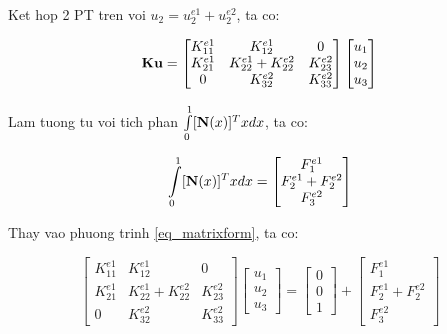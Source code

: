 Ket hop 2 PT tren voi $u_2 = u_2^{e1} + u_2^{e2}$, ta co:

\begin{equation}
    {\bf K}{\bf u} = \begin{bmatrix}
        K_{11}^{e1} & K_{12}^{e1} & 0\\
        K_{21}^{e1} & K_{22}^{e1}+K_{22}^{e2} & K_{23}^{e2} \\
        0 & K_{32}^{e2} & K_{33}^{e2}
    \end{bmatrix}\begin{bmatrix}
        u_1 \\ u_2 \\ u_3
    \end{bmatrix}
\end{equation}

Lam tuong tu voi tich phan $ \int\limits_0^1 [{\bf N}(x)]^Tx dx$, ta co:

\begin{equation}
    \int\limits_0^1 [{\bf N}(x)]^Tx dx = \begin{bmatrix}
        F_1^{e1} \\ F_2^{e1}+F_2^{e2} \\ F_3^{e2}
    \end{bmatrix}
\end{equation}

Thay vao phuong trinh \cref{eq_matrixform}, ta co:

\begin{equation}
    \begin{bmatrix}
        K_{11}^{e1} & K_{12}^{e1} & 0\\
        K_{21}^{e1} & K_{22}^{e1}+K_{22}^{e2} & K_{23}^{e2} \\
        0 & K_{32}^{e2} & K_{33}^{e2}
    \end{bmatrix}\begin{bmatrix}
        u_1 \\ u_2 \\ u_3
    \end{bmatrix} = \begin{bmatrix}
        0 \\ 0 \\ 1
    \end{bmatrix} + \begin{bmatrix}
        F_1^{e1} \\ F_2^{e1}+F_2^{e2} \\ F_3^{e2}
    \end{bmatrix}
\end{equation}

